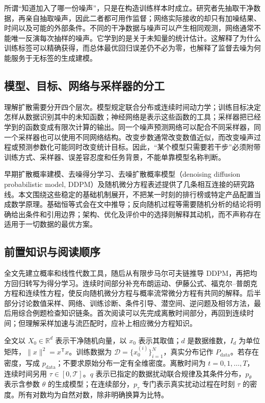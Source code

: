 \documentclass[UTF8,12pt,a4paper,fontset=fandol]{ctexart}
\begin{document}
所谓“知道加入了哪一份噪声”，只是在构造训练样本时成立。研究者先抽取干净数据，再亲自抽取噪声，因此二者都可用作监督；网络实际接收的却只有加噪结果、时间以及可能的外部条件。不同的干净数据与噪声可以产生相同观测，网络通常不能唯一反演每次抽样的噪声。它学到的是关于未知量的统计估计。这解释了为什么训练标签可以精确获得，而总体最优回归误差仍不必为零，也解释了监督去噪为何能服务于无标签的生成建模。

\subsection{模型、目标、网络与采样器的分工}
理解扩散需要分开四个层次。模型规定联合分布或连续时间动力学；训练目标决定怎样从数据识别其中的未知函数；神经网络是表示这些函数的工具；采样器把已经学到的函数变成有限次计算的输出。同一个噪声预测网络可以配合不同采样器，同一个采样器也可以使用不同网络结构。改变步数通常改变数值近似，而改变噪声过程或预测参数化可能同时改变统计目标。因此，“某个模型只需要若干步”必须附带训练方式、采样器、误差容忍度和任务背景，不能单靠模型名称判断。

早期扩散概率建模、去噪得分学习、去噪扩散概率模型（denoising diffusion probabilistic model, DDPM）及随机微分方程表述提供了几条相互连接的研究路线\cite{sohl2015,song2019,ho2020,song2021sde}。本文围绕这些稳定的基础机制展开，不把某一时刻的排行榜或特定产品配置当成数学原理。基础恒等式会在文中推导；反向随机过程等需要随机分析的结论将明确给出条件和引用边界；架构、优化及评价中的选择则解释其动机，而不声称存在适用于一切数据的最优方案。

\subsection{前置知识与阅读顺序}
全文先建立概率和线性代数工具，随后从有限步马尔可夫链推导 DDPM，再把均方回归转写为得分学习。连续时间部分补充布朗运动、伊藤公式、福克尔--普朗克方程和连续性方程，使反向随机微分方程与概率流常微分方程有共同的解释。后半部分讨论数值采样、网络、训练诊断、条件引导、潜空间、逆问题及相邻方法，最后用综合例题检查知识链条。首次阅读可以先完成离散时间部分，再回到连续时间；但理解采样加速与流匹配时，应补上相应微分方程知识。

全文以 $X_0\in\mathbb R^d$ 表示干净随机向量，以 $x_0$ 表示其取值；$d$ 是数据维数，$I_d$ 为单位矩阵，$\|x\|^2=x^\mathsf T x$。训练数据为 $\mathcal D=\{x_0^{(i)}\}_{i=1}^{N}$，真实分布记作 $P_{\mathrm{data}}$。若存在密度，写成 $p_{\mathrm{data}}$；不要求原始分布一定有全维密度。离散时间为 $t=0,1,\ldots,T$，连续时间另用 $\tau\in[0,\mathcal T]$。$q$ 表示已指定的数据扰动联合规律及其条件分布，$p_\theta$ 表示含参数 $\theta$ 的生成模型；在连续部分，$p_\tau$ 专门表示真实扰动过程在时刻 $\tau$ 的密度。所有对数均为自然对数，除非明确换算为比特。
\end{document}
